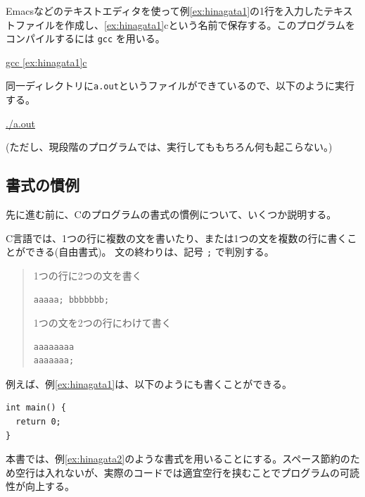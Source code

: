 Emacsなどのテキストエディタを使って例\ref{ex:hinagata1}の1行を入力したテキストファイルを作成し、\ref{ex:hinagata1}cという名前で保存する。このプログラムをコンパイルするには \verb+gcc+ を用いる。
\begin{commandline2}
\prompt \underline{gcc \ref{ex:hinagata1}c}
\end{commandline2} \noindent
同一ディレクトリに{\tt a.out}というファイルができているので、以下のように実行する。
\begin{commandline2}
\prompt \underline{./a.out}
\end{commandline2} \noindent
(ただし、現段階のプログラムでは、実行してももちろん何も起こらない。)

\subsection{書式の慣例}

先に進む前に、Cのプログラムの書式の慣例について、いくつか説明する。

C言語では、1つの行に複数の文を書いたり、または1つの文を複数の行に書くことができる(自由書式)。
文の終わりは、記号 \verb+;+ で判別する。
\begin{quote}
  1つの行に2つの文を書く
\begin{verbatim}
aaaaa; bbbbbbb;
\end{verbatim}
  1つの文を2つの行にわけて書く
\begin{verbatim}
aaaaaaaa
aaaaaaa;
\end{verbatim}
\end{quote}
例えば、例\ref{ex:hinagata1}は、以下のようにも書くことができる。
\begin{reidai}\label{ex:hinagata2}
\begin{verbatim}
int main() {
  return 0;
}
\end{verbatim}
\end{reidai} \noindent
本書では、例\ref{ex:hinagata2}のような書式を用いることにする。スペース節約のため空行は入れないが、実際のコードでは適宜空行を挟むことでプログラムの可読性が向上する。

